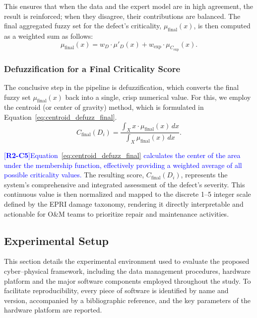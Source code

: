 \documentclass[energies,article,submit,pdftex,moreauthors]{Definitions/mdpi}
\newcommand{\revtag}[2]{[\textbf{R#1-C#2}]}
\newcommand{\Rtwo}[1]{\textcolor{blue}{#1}}
\begin{document}
This ensures that when the data and the expert model are in high agreement, the result is reinforced; when they disagree, their contributions are balanced. The final aggregated fuzzy set for the defect's criticality, \(\mu_{\text{final}}(x)\), is then computed as a weighted sum as follows:
\begin{equation}
    \mu_{\text{final}}(x) = w_D \cdot \mu'_{D}(x) + w_{\text{exp}} \cdot \mu_{C_{\text{exp}}}(x).
    \label{eq:final_aggregation}
\end{equation}

\subsubsection{Defuzzification for a Final Criticality Score}
The conclusive step in the pipeline is defuzzification, which converts the final fuzzy set \(\mu_{\text{final}}(x)\) back into a single, crisp numerical value. For this, we employ the centroid (or center of gravity) method, which is formulated in Equation~\ref{eq:centroid_defuzz_final}. 
\begin{equation}
    C_{\text{final}}(D_i) = \frac{\int_X x \cdot \mu_{\text{final}}(x) \, dx}{\int_X \mu_{\text{final}}(x) \, dx}.
    \label{eq:centroid_defuzz_final}
\end{equation}

\Rtwo{\revtag{2}{5}Equation~\ref{eq:centroid_defuzz_final} calculates the center of the area under the membership function, effectively providing a weighted average of all possible criticality values.} The resulting score, \(C_{\text{final}}(D_i)\), represents the system's comprehensive and integrated assessment of the defect's severity. This continuous value is then normalized and mapped to the discrete 1--5 integer scale defined by the EPRI damage taxonomy, rendering it directly interpretable and actionable for O\&M teams to prioritize repair and maintenance activities.

\subsection{Experimental Setup}
This section details the experimental environment used to evaluate the proposed cyber--physical framework, including the data management procedures, hardware platform and the major software components employed throughout the study. To facilitate reproducibility, every piece of software is identified by name and version, accompanied by a bibliographic reference, and the key parameters of the hardware platform are reported.
\end{document}
